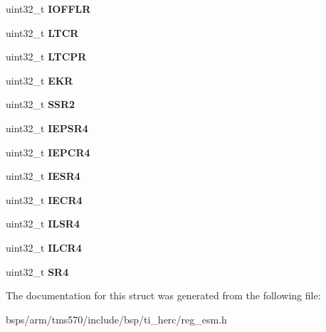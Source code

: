 \begin{DoxyCompactItemize}
\item 
\mbox{\label{structtms570__esm__t_a480ff015fc592a29ead556c5a1cad5b0}} 
uint32\+\_\+t {\bfseries I\+O\+F\+F\+LR}
\item 
\mbox{\label{structtms570__esm__t_a4ae7715a150ce0e3aa3ffb7a6d1ccd0a}} 
uint32\+\_\+t {\bfseries L\+T\+CR}
\item 
\mbox{\label{structtms570__esm__t_a7595969f2af52aeaa4dc0e9df686d6c0}} 
uint32\+\_\+t {\bfseries L\+T\+C\+PR}
\item 
\mbox{\label{structtms570__esm__t_a2d246e04c721a646a8915ef7153fb9e6}} 
uint32\+\_\+t {\bfseries E\+KR}
\item 
\mbox{\label{structtms570__esm__t_a32e6d30a9c7d7ffcd77989b67e83a451}} 
uint32\+\_\+t {\bfseries S\+S\+R2}
\item 
\mbox{\label{structtms570__esm__t_acdc68854988785a499ea271d11ef8502}} 
uint32\+\_\+t {\bfseries I\+E\+P\+S\+R4}
\item 
\mbox{\label{structtms570__esm__t_af69e0eb191a5365cca8ffca5affbf9e4}} 
uint32\+\_\+t {\bfseries I\+E\+P\+C\+R4}
\item 
\mbox{\label{structtms570__esm__t_a5f65f99574494fe3f5d86c120ef1b6a0}} 
uint32\+\_\+t {\bfseries I\+E\+S\+R4}
\item 
\mbox{\label{structtms570__esm__t_aee82dc9619c655352329d17dd3f1a5b1}} 
uint32\+\_\+t {\bfseries I\+E\+C\+R4}
\item 
\mbox{\label{structtms570__esm__t_a43166623bb11759016ead64dc336da1b}} 
uint32\+\_\+t {\bfseries I\+L\+S\+R4}
\item 
\mbox{\label{structtms570__esm__t_ab24ea5067252681d2492c24fc80d4e3b}} 
uint32\+\_\+t {\bfseries I\+L\+C\+R4}
\item 
\mbox{\label{structtms570__esm__t_a53ed29ddfd400f6a6fefdac8b6fb6e3c}} 
uint32\+\_\+t {\bfseries S\+R4}
\end{DoxyCompactItemize}


The documentation for this struct was generated from the following file\+:\begin{DoxyCompactItemize}
\item 
bsps/arm/tms570/include/bsp/ti\+\_\+herc/reg\+\_\+esm.\+h\end{DoxyCompactItemize}
